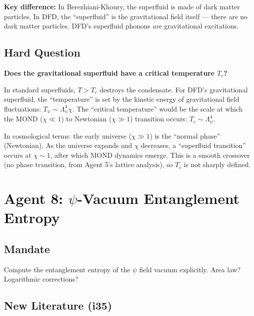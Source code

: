 \documentclass[11pt,a4paper]{article}
\begin{document}
\textbf{Key difference:} In Berezhiani-Khoury, the superfluid is made of dark matter particles. In DFD, the ``superfluid'' is the gravitational field itself --- there are no dark matter particles. DFD's superfluid phonons \emph{are} gravitational excitations.

\subsection{Hard Question}

\textbf{Does the gravitational superfluid have a critical temperature $T_c$?}

In standard superfluids, $T > T_c$ destroys the condensate. For DFD's gravitational superfluid, the ``temperature'' is set by the kinetic energy of gravitational field fluctuations: $T_\psi \sim \Lambda_\psi^4\chi$. The ``critical temperature'' would be the scale at which the MOND ($\chi \ll 1$) to Newtonian ($\chi \gg 1$) transition occurs: $T_c \sim \Lambda_\psi^4$.

In cosmological terms: the early universe ($\chi \gg 1$) is the ``normal phase'' (Newtonian). As the universe expands and $\chi$ decreases, a ``superfluid transition'' occurs at $\chi \sim 1$, after which MOND dynamics emerge. This is a smooth crossover (no phase transition, from Agent 5's lattice analysis), so $T_c$ is not sharply defined.

\newpage
\section{Agent 8: $\psi$-Vacuum Entanglement Entropy}
\label{sec:agent8}

\subsection{Mandate}

Compute the entanglement entropy of the $\psi$ field vacuum explicitly. Area law? Logarithmic corrections?

\subsection{New Literature (i35)}
\end{document}
